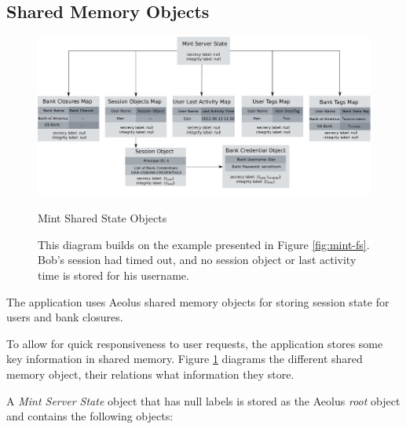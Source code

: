 \subsection{Shared Memory Objects}
\label{sec:mint-smo}

\begin{figure}[h]
\centering
\includegraphics[width=\textwidth,height=\textheight,keepaspectratio]{figures/mint-shared-state}
\caption*{Mint Shared State Objects}
\caption[Mint Shared State Objects]{This diagram builds on the example presented in Figure \ref{fig:mint-fs}. Bob's session had timed out, and no session object or last activity time is stored for his username.}
\label{fig:mint-ss}
\end{figure}

The application uses Aeolus shared memory objects for storing session state for users and bank closures.

To allow for quick responsiveness to user requests, the application stores some key information in shared memory. Figure \ref{fig:mint-ss} diagrams the different shared memory object, their relations what information they store.

A \emph{Mint Server State} object that has null labels is stored as the Aeolus \emph{root} object and contains the following objects:

